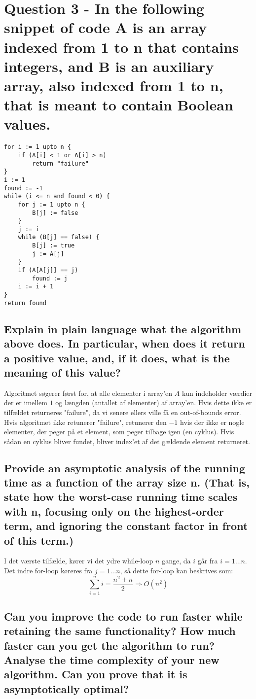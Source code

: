 \documentclass[a4paper,12pt]{article}
\begin{document}
\section[Question 3]{Question 3 - In the following snippet of code A is an array indexed from 1 to n that contains integers,
and B is an auxiliary array, also indexed from 1 to n, that is meant to contain Boolean values.}

\begin{lstlisting}
for i := 1 upto n {
    if (A[i] < 1 or A[i] > n)
        return "failure"
}
i := 1
found := -1
while (i <= n and found < 0) {
    for j := 1 upto n {
        B[j] := false
    }
    j := i
    while (B[j] == false) {
        B[j] := true
        j := A[j]
    }
    if (A[A[j]] == j)
        found := j
    i := i + 1
}
return found
\end{lstlisting}
    
\subsection[]{Explain in plain language what the algorithm above does. In particular, when does it
return a positive value, and, if it does, what is the meaning of this value?}
    
Algoritmet søgerer først for, at alle elementer i array'en $A$ kun indeholder værdier der er imellem $1$ og længden (antallet af elementer) af array'en. Hvis dette ikke er tilfældet returneres "failure", da vi senere ellers ville få en out-of-bounds error. Hvis algoritmet ikke retunerer "failure", retunerer den $-1$ hvis der ikke er nogle elementer, der peger på et element, som peger tilbage igen (en cyklus). Hvis sådan en cyklus bliver fundet, bliver index'et af det gældende element returneret.
    
\subsection[]{Provide an asymptotic analysis of the running time as a function of the array size n. (That
is, state how the worst-case running time scales with n, focusing only on the highest-order
term, and ignoring the constant factor in front of this term.)}

I det værste tilfælde, kører vi det ydre while-loop $n$ gange, da $i$ går fra $i=1\dots n$. Det indre for-loop køreres fra $j=1\dots n$, så dette for-loop kan beskrives som:
\[\sum_{i=1}^{n}i = \dfrac{n^2+n}{2} \Rightarrow O(n^2)\]

\subsection[]{Can you improve the code to run faster while retaining the same functionality? How
much faster can you get the algorithm to run? Analyse the time complexity of your new
algorithm. Can you prove that it is asymptotically optimal?}
\end{document}
